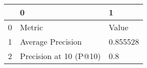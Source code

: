 \begin{tabular}{lll}
\toprule
{} &                       0 &         1 \\
\midrule
0 &                  Metric &     Value \\
1 &       Average Precision &  0.855528 \\
2 &  Precision at 10 (P@10) &       0.8 \\
\bottomrule
\end{tabular}
